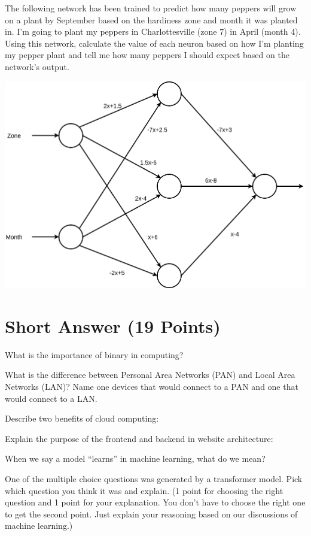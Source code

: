 \documentclass{exam}
\begin{document}
\begin{questions}
\newpage
\question[5] The following network has been trained to predict how many peppers will grow on a plant by September based on the hardiness zone and month it was planted in. I'm going to plant my peppers in Charlottesville (zone 7) in April (month 4). Using this network, calculate the value of each neuron based on how I'm planting my pepper plant and tell me how many peppers I should expect based on the network's output.

\includegraphics[width=\linewidth]{network.png}

\newpage

\section{Short Answer (19 Points)}
\question[3] What is the importance of binary in computing?
\vspace{2in}

\question[3] What is the difference between Personal Area Networks (PAN) and Local Area Networks (LAN)? Name one devices that would connect to a PAN and one that would connect to a LAN.
\vspace{2in}

\question[3] Describe two benefits of cloud computing:
\newpage

\question[2] Explain the purpose of the frontend and backend in website architecture:
\vspace{2in}

\question[3] When we say a model ``learns'' in machine learning, what do we mean?
\vspace{2in}


\bonusquestion[2] One of the multiple choice questions was generated by a transformer model. Pick which question you think it was and explain. (1 point for choosing the right question and 1 point for your explanation. You don't have to choose the right one to get the second point. Just explain your reasoning based on our discussions of machine learning.)
\end{questions}
\end{document}

